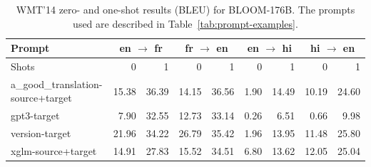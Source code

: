 \documentclass[twoside,11pt]{article}
\begin{document}
\begin{table}[ht!]
\centering\small
\addtolength{\tabcolsep}{-2.5pt}
\begin{tabular}{lrr|rr|rr|rr}
\toprule
Prompt & \multicolumn{2}{c}{en $\rightarrow$ fr} & \multicolumn{2}{c}{fr $\rightarrow$ en } & \multicolumn{2}{c}{en $\rightarrow$ hi} & \multicolumn{2}{c}{hi $\rightarrow$ en} \\
\midrule
Shots  & 0 & 1 & 0 & 1 & 0 & 1 & 0 & 1 \\
\midrule
a\_good\_translation-source+target & 15.38 & 36.39 & 14.15 & 36.56 & 1.90 & 14.49 & 10.19 & 24.60  \\
gpt3-target     & 7.90 & 32.55 & 12.73 & 33.14 & 0.26 & 6.51 & 0.66 & 9.98 \\
version-target  & 21.96 & 34.22 & 26.79 & 35.42 & 1.96 & 13.95 & 11.48 & 25.80 \\
xglm-source+target     & 14.91 & 27.83 & 15.52 & 34.51 & 6.80 & 13.62 & 12.05 & 25.04 \\
\bottomrule
\end{tabular}%
\caption{WMT'14 zero- and one-shot results (BLEU) for BLOOM-176B. The prompts used are described in Table~\ref{tab:prompt-examples}.}%
\label{tab:WMT-14enfr-byprompts-0shot}
\end{table}
\end{document}
